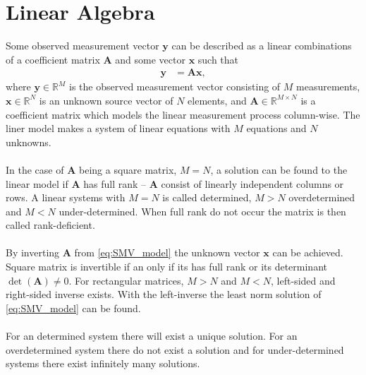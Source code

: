 \section{Linear Algebra}
Some observed measurement vector $\mathbf{y}$ can be described as a linear combinations of a coefficient matrix $\mathbf{A}$ and some vector $\mathbf{x}$ such that
\begin{align}\label{eq:SMV_model}
\mathbf{y} &= \mathbf{Ax},
\end{align}
where $\mathbf{y} \in \mathbb{R}^M$ is the observed measurement vector consisting of $M$ measurements, $\mathbf{x} \in \mathbb{R}^N$ is an unknown source vector of $N$ elements, and $\mathbf{A} \in \mathbb{R}^{M \times N}$ is a coefficient matrix which models the linear measurement process column-wise. The liner model makes a system of linear equations with $M$ equations and $N$ unknowns.
\\ \\
In the case of $\mathbf{A}$ being a square matrix, $M = N$, a solution can be found to the linear model if $\mathbf{A}$ has full rank -- $\mathbf{A}$ consist of linearly independent columns or rows.
A linear systems with $M = N$ is called determined, $M > N$ overdetermined and $M < N$ under-determined. 
When full rank do not occur the matrix is then called rank-deficient.
\\ \\
By inverting $\mathbf{A}$ from \eqref{eq:SMV_model} the unknown vector $\mathbf{x}$ can be achieved. Square matrix is invertible if an only if its has full rank or its determinant $\det(\mathbf{A}) \neq 0$. For rectangular matrices, $M > N$ and $M < N$, left-sided and right-sided inverse exists.
With the left-inverse the least norm solution of \eqref{eq:SMV_model} can be found.
\\ \\
For an determined system there will exist a unique solution. For an overdetermined system there do not exist a solution and for under-determined systems there exist infinitely many solutions.
